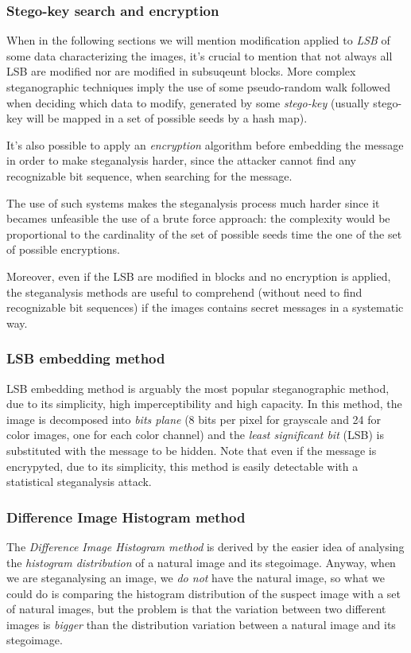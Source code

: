 \documentclass[../../main.tex]{subfiles}
\begin{document}
    \subsubsection{Stego-key search and encryption}
    When in the following sections we will mention modification applied to
    \emph{LSB} of some data characterizing the images, it's crucial to mention
    that not always all LSB are modified nor are modified in subsuqeunt blocks.
    More complex steganographic techniques imply the use of some pseudo-random
    walk followed when deciding which data to modify, generated by some
    \emph{stego-key} (usually stego-key will be mapped in a set of possible
    seeds by a hash map).

    It's also possible to apply an \emph{encryption} algorithm before embedding
    the message in order to make steganalysis harder, since the attacker cannot
    find any recognizable bit sequence, when searching for the message.

    The use of such systems makes the steganalysis process much harder since it
    becames unfeasible the use of a brute force approach: the complexity would
    be proportional to the cardinality of the set of possible seeds time the
    one of the set of possible encryptions.

    Moreover, even if the LSB are modified in blocks and no encryption is
    applied, the steganalysis methods are useful to comprehend (without need to
    find recognizable bit sequences) if the images contains secret messages in
    a systematic way.


    \subsubsection{LSB embedding method}
    LSB embedding method is arguably the most popular steganographic method, due
    to its simplicity, high imperceptibility and high capacity.
    In this method, the image is decomposed into \emph{bits plane} (8 bits per
    pixel for grayscale and 24 for color images, one for each color channel)
    and the \emph{least significant bit} (LSB) is substituted with the message
    to be hidden.
    Note that even if the message is encrypyted, due to its simplicity, this
    method is easily detectable with a statistical steganalysis attack.
    

    \subsubsection{Difference Image Histogram method}
    The \emph{Difference Image Histogram method} is derived by the easier idea
    of analysing the \emph{histogram distribution} of a natural image and its
    stegoimage. Anyway, when we are steganalysing an image, we \emph{do not}
    have the natural image, so what we could do is comparing the histogram
    distribution of the suspect image with a set of natural images, but the
    problem is that the variation between two different images is \emph{bigger}
    than the distribution variation between a natural image and its stegoimage.
    \cite{methodology-steganalysis-images}
\end{document}
